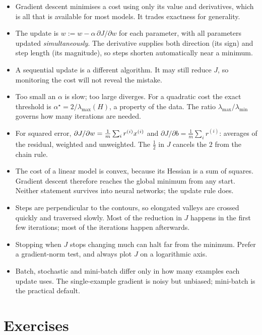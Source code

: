 \begin{itemize}
  \item Gradient descent minimises a cost using only its value and derivatives,
        which is all that is available for most models. It trades exactness for
        generality.
  \item The update is $w := w - \alpha\,\partial J/\partial w$ for each
        parameter, with all parameters updated \emph{simultaneously}. The
        derivative supplies both direction (its sign) and step length (its
        magnitude), so steps shorten automatically near a minimum.
  \item A sequential update is a different algorithm. It may still reduce $J$,
        so monitoring the cost will not reveal the mistake.
  \item Too small an $\alpha$ is slow; too large diverges. For a quadratic cost
        the exact threshold is $\alpha^\star = 2/\lambda_{\max}(H)$, a property
        of the data. The ratio $\lambda_{\max}/\lambda_{\min}$ governs how many
        iterations are needed.
  \item For squared error, $\partial J/\partial w = \frac1m\sum_i r^{(i)}x^{(i)}$
        and $\partial J/\partial b = \frac1m\sum_i r^{(i)}$: averages of the
        residual, weighted and unweighted. The $\tfrac12$ in $J$ cancels the $2$
        from the chain rule.
  \item The cost of a linear model is convex, because its Hessian is a sum of
        squares. Gradient descent therefore reaches the global minimum from any
        start. Neither statement survives into neural networks; the update rule
        does.
  \item Steps are perpendicular to the contours, so elongated valleys are
        crossed quickly and traversed slowly. Most of the reduction in $J$
        happens in the first few iterations; most of the iterations happen
        afterwards.
  \item Stopping when $J$ stops changing much can halt far from the minimum.
        Prefer a gradient-norm test, and always plot $J$ on a logarithmic axis.
  \item Batch, stochastic and mini-batch differ only in how many examples each
        update uses. The single-example gradient is noisy but unbiased;
        mini-batch is the practical default.
\end{itemize}

\section*{Exercises}

